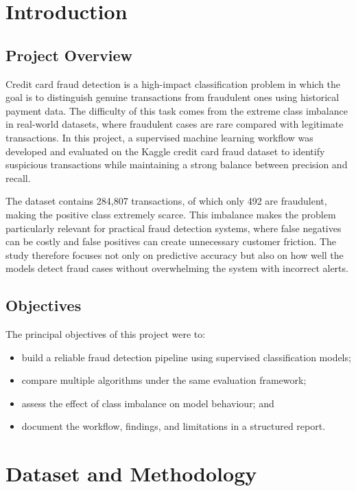
\chapter{Introduction}
\section{Project Overview}
Credit card fraud detection is a high-impact classification problem in which the goal is to distinguish genuine transactions from fraudulent ones using historical payment data. The difficulty of this task comes from the extreme class imbalance in real-world datasets, where fraudulent cases are rare compared with legitimate transactions. In this project, a supervised machine learning workflow was developed and evaluated on the Kaggle credit card fraud dataset to identify suspicious transactions while maintaining a strong balance between precision and recall.

The dataset contains 284,807 transactions, of which only 492 are fraudulent, making the positive class extremely scarce. This imbalance makes the problem particularly relevant for practical fraud detection systems, where false negatives can be costly and false positives can create unnecessary customer friction. The study therefore focuses not only on predictive accuracy but also on how well the models detect fraud cases without overwhelming the system with incorrect alerts.

\section{Objectives}
The principal objectives of this project were to:
\begin{itemize}
  \item build a reliable fraud detection pipeline using supervised classification models;
  \item compare multiple algorithms under the same evaluation framework;
  \item assess the effect of class imbalance on model behaviour; and
  \item document the workflow, findings, and limitations in a structured report.
\end{itemize}

\chapter{Dataset and Methodology}
